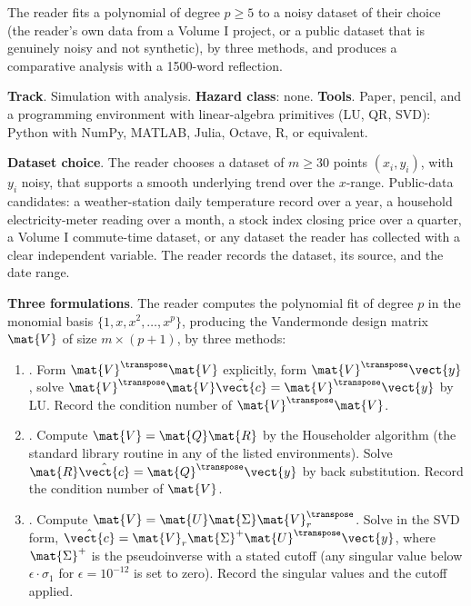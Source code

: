 \begin{project}
The reader fits a polynomial of degree $p \geq 5$ to a noisy dataset
of their choice (the reader's own data from a Volume I project, or
a public dataset that is genuinely noisy and not synthetic), by
three methods, and produces a comparative analysis with a
1500-word reflection.

\textbf{Track}. Simulation with analysis. \textbf{Hazard class}: none.
\textbf{Tools}. Paper, pencil, and a programming environment with
linear-algebra primitives (LU, QR, SVD): Python with NumPy, MATLAB,
Julia, Octave, R, or equivalent.

\textbf{Dataset choice}. The reader chooses a dataset of $m \geq 30$
points $(x_{i}, y_{i})$, with $y_{i}$ noisy, that supports a smooth
underlying trend over the $x$-range. Public-data candidates: a
weather-station daily temperature record over a year, a household
electricity-meter reading over a month, a stock index closing price
over a quarter, a Volume I commute-time dataset, or any dataset the
reader has collected with a clear independent variable. The reader
records the dataset, its source, and the date range.

\textbf{Three formulations}. The reader computes the polynomial fit
of degree $p$ in the monomial basis $\{1, x, x^{2}, \ldots, x^{p}\}$,
producing the Vandermonde design matrix $\mat{V}$ of size $m \times
(p+1)$, by three methods:

\begin{enumerate}[leftmargin=*]
  \item {}. Form $\mat{V}^{\transpose}\mat{V}$
    explicitly, form $\mat{V}^{\transpose}\vect{y}$, solve
    $\mat{V}^{\transpose}\mat{V}\hat{\vect{c}} = \mat{V}^{\transpose}\vect{y}$
    by LU. Record the condition number of $\mat{V}^{\transpose}\mat{V}$.
  \item {}. Compute $\mat{V} = \mat{Q}\mat{R}$ by the
    Householder algorithm (the standard library routine in any of
    the listed environments). Solve $\mat{R}\hat{\vect{c}} =
    \mat{Q}^{\transpose}\vect{y}$ by back substitution. Record the
    condition number of $\mat{V}$.
  \item {}. Compute $\mat{V} = \mat{U}\mat{\Sigma}
    \mat{V}_{r}^{\transpose}$. Solve in the SVD form,
    $\hat{\vect{c}} = \mat{V}_{r}\mat{\Sigma}^{+}\mat{U}^{\transpose}
    \vect{y}$, where $\mat{\Sigma}^{+}$ is the pseudoinverse with
    a stated cutoff (any singular value below $\epsilon \cdot
    \sigma_{1}$ for $\epsilon = 10^{-12}$ is set to zero). Record
    the singular values and the cutoff applied.
\end{enumerate}


\end{project}
